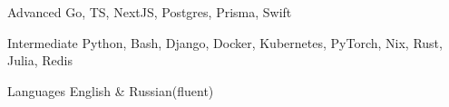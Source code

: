 
\begin{cvskills}

  \cvskill
    {Advanced}
    {Go, TS, NextJS, Postgres, Prisma, Swift}

    \cvskill
    {Intermediate}
    {Python, Bash, Django, Docker, Kubernetes, PyTorch, Nix, Rust, Julia, Redis}

  \cvskill
    {Languages}
    {English \& Russian(fluent)}

\end{cvskills}
